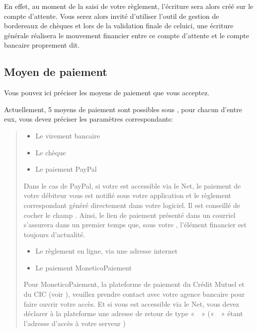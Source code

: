 \documentclass[a4paper,10pt,oneside,french]{sphinxmanual}
\begin{document}
En effet, au moment de la saisi de votre règlement, l’écriture sera alors créé sur le compte d’attente.
Vous serez alors invité d’utiliser l’outil de gestion de bordereaux de chèques et lors de la validation finale de celui\sphinxhyphen{}ci,
une écriture générale réalisera le mouvement financier entre ce compte d’attente et le compte bancaire proprement dit.


\subsection{Moyen de paiement}
\label{\detokenize{payoff/config:moyen-de-paiement}}
Vous pouvez ici préciser les moyens de paiement que vous acceptez.

Actuellement, 5 moyens de paiement sont possibles sous , pour chacun d’entre eux, vous devez préciser les paramètres correspondants:
\begin{quote}
\begin{itemize}
\item {} 
Le virement bancaire

\item {} 
Le chèque

\item {} 
Le paiement PayPal

\end{itemize}

Dans le cas de PayPal, si votre  est accessible via le Net, le paiement de votre débiteur vous est notifié sous votre application et le règlement correspondant généré directement dans votre logiciel.
Il est conseillé de cocher le champ . Ainsi, le lien de paiement présenté dans un courriel s’assurera dans un premier temps que, sous votre , l’élément financier est toujours d’actualité.
\begin{itemize}
\item {} 
Le règlement en ligne, via une adresse internet

\item {} 
Le paiement MoneticoPaiement

\end{itemize}

Pour MoneticoPaiement, la plateforme de paiement du Crédit Mutuel et du CIC (voir ), veuillez prendre contact avec votre agence bancaire pour faire ouvrir votre accès.
Et si vous  est accessible via le Net, vous devez déclarer à la plateforme une adresse de retour de type «  » («  » étant l’adresse d’accès à votre serveur )
\end{quote}
\end{document}
